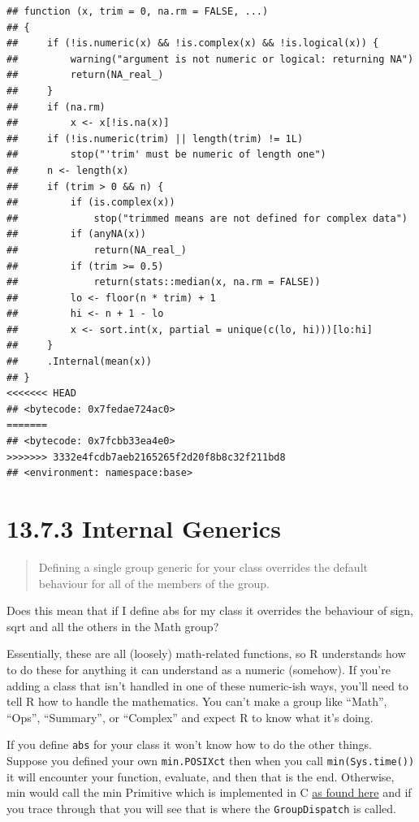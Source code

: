 \documentclass[]{book}
\begin{document}
\begin{verbatim}
## function (x, trim = 0, na.rm = FALSE, ...) 
## {
##     if (!is.numeric(x) && !is.complex(x) && !is.logical(x)) {
##         warning("argument is not numeric or logical: returning NA")
##         return(NA_real_)
##     }
##     if (na.rm) 
##         x <- x[!is.na(x)]
##     if (!is.numeric(trim) || length(trim) != 1L) 
##         stop("'trim' must be numeric of length one")
##     n <- length(x)
##     if (trim > 0 && n) {
##         if (is.complex(x)) 
##             stop("trimmed means are not defined for complex data")
##         if (anyNA(x)) 
##             return(NA_real_)
##         if (trim >= 0.5) 
##             return(stats::median(x, na.rm = FALSE))
##         lo <- floor(n * trim) + 1
##         hi <- n + 1 - lo
##         x <- sort.int(x, partial = unique(c(lo, hi)))[lo:hi]
##     }
##     .Internal(mean(x))
## }
<<<<<<< HEAD
## <bytecode: 0x7fedae724ac0>
=======
## <bytecode: 0x7fcbb33ea4e0>
>>>>>>> 3332e4fcdb7aeb2165265f2d20f8b8c32f211bd8
## <environment: namespace:base>
\end{verbatim}

\hypertarget{internal-generics}{%
\section*{13.7.3 Internal Generics}\label{internal-generics}}

\begin{quote}
Defining a single group generic for your class overrides the default behaviour for all of the members of the group.
\end{quote}

Does this mean that if I define abs for my class it overrides the behaviour of sign, sqrt and all the others in the Math group?

Essentially, these are all (loosely) math-related functions, so R understands how to do these for anything it can understand as a numeric (somehow). If you're adding a class that isn't handled in one of these numeric-ish ways, you'll need to tell R how to handle the mathematics. You can't make a group like ``Math'', ``Ops'', ``Summary'', or ``Complex'' and expect R to know what it's doing.

If you define \texttt{abs} for your class it won't know how to do the other things. Suppose you defined your own \texttt{min.POSIXct} then when you call \texttt{min(Sys.time())} it will encounter your function, evaluate, and then that is the end. Otherwise, min would call the min Primitive which is implemented in C \href{https://github.com/wch/r-source/blob/bf4cf8912596162a3ae5a2b7da1a74220105b172/src/main/summary.c\#L520}{as found here} and if you trace through that you will see that is where the \texttt{GroupDispatch} is called.
\end{document}
